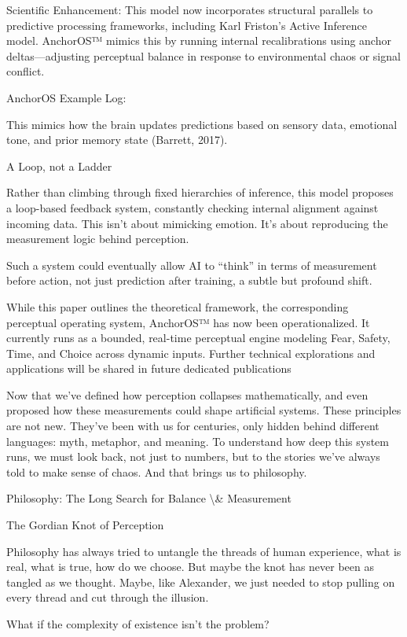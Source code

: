 \documentclass[12pt]{article}
\begin{document}
Scientific Enhancement: This model now incorporates structural parallels to predictive processing frameworks, including Karl Friston’s Active Inference model. AnchorOS™ mimics this by running internal recalibrations using anchor deltas—adjusting perceptual balance in response to environmental chaos or signal conflict.

AnchorOS Example Log:

This mimics how the brain updates predictions based on sensory data, emotional tone, and prior memory state (Barrett, 2017).

A Loop, not a Ladder

Rather than climbing through fixed hierarchies of inference, this model proposes a loop-based feedback system, constantly checking internal alignment against incoming data. This isn’t about mimicking emotion. It’s about reproducing the measurement logic behind perception.

Such a system could eventually allow AI to “think” in terms of measurement before action, not just prediction after training, a subtle but profound shift.

While this paper outlines the theoretical framework, the corresponding perceptual operating system, AnchorOS™ has now been operationalized. It currently runs as a bounded, real-time perceptual engine modeling Fear, Safety, Time, and Choice across dynamic inputs. Further technical explorations and applications will be shared in future dedicated publications

Now that we’ve defined how perception collapses mathematically, and even proposed how these measurements could shape artificial systems. These principles are not new. They’ve been with us for centuries, only hidden behind different languages: myth, metaphor, and meaning. To understand how deep this system runs, we must look back, not just to numbers, but to the stories we’ve always told to make sense of chaos.
And that brings us to philosophy.

Philosophy: The Long Search for Balance \textbackslash{}& Measurement

The Gordian Knot of Perception

Philosophy has always tried to untangle the threads of human experience, what is real, what is true, how do we choose. But maybe the knot has never been as tangled as we thought. Maybe, like Alexander, we just needed to stop pulling on every thread and cut through the illusion.

What if the complexity of existence isn’t the problem?
\end{document}
